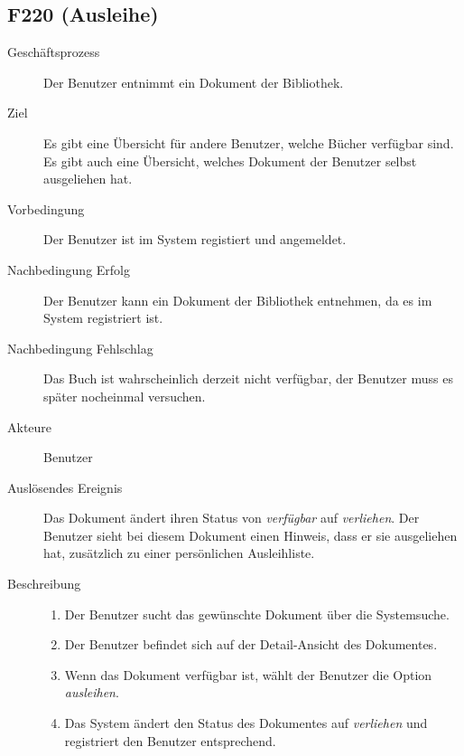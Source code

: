 \subsection{F220 (Ausleihe)}
\begin{description}
  \item[Geschäftsprozess]Der Benutzer entnimmt ein Dokument der Bibliothek.
  \item[Ziel]Es gibt eine Übersicht für andere Benutzer, welche Bücher verfügbar sind. Es gibt auch eine Übersicht, welches Dokument der Benutzer selbst ausgeliehen hat.
  \item[Vorbedingung]Der Benutzer ist im System registiert und angemeldet.
  \item[Nachbedingung Erfolg]Der Benutzer kann ein Dokument der Bibliothek entnehmen, da es im System registriert ist.
  \item[Nachbedingung Fehlschlag]Das Buch ist wahrscheinlich derzeit nicht verfügbar, der Benutzer muss es später nocheinmal versuchen.
  \item[Akteure]Benutzer
  \item[Auslösendes Ereignis]Das Dokument ändert ihren Status von \emph{verfügbar} auf \emph{verliehen}. Der Benutzer sieht bei diesem Dokument einen Hinweis, dass er sie ausgeliehen hat, zusätzlich zu einer persönlichen Ausleihliste.
  \item[Beschreibung]\hfill
    \begin{enumerate}
      \item Der Benutzer sucht das gewünschte Dokument über die Systemsuche.
      \item Der Benutzer befindet sich auf der Detail-Ansicht des Dokumentes.
      \item Wenn das Dokument verfügbar ist, wählt der Benutzer die Option \emph{ausleihen}.
      \item Das System ändert den Status des Dokumentes auf \emph{verliehen} und registriert den Benutzer entsprechend.
    \end{enumerate}
\end{description}

